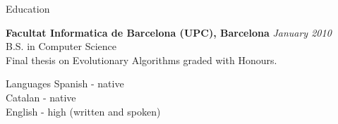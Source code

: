 \documentclass{resume} %
\begin{document}

\begin{rSection}{Education}

{\bf Facultat Informatica de Barcelona (UPC), Barcelona} \hfill {\em January 2010} \\
B.S. in Computer Science \\
Final thesis on Evolutionary Algorithms graded with Honours. \smallskip \\
\end{rSection}

\begin{rSection}{Languages}
Spanish - native\\
Catalan - native\\
English - high (written and spoken)\\
\end{rSection}
\end{document}
